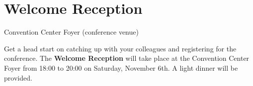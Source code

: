 \clearpage
\section[Welcome Reception]{Welcome Reception}
\setheaders{}{\daydateyear}

\begin{center}


Convention Center Foyer (conference venue)\\
\end{center}

\noindent Get a head start on catching up with your colleagues and registering for the conference.
The \textbf{Welcome Reception} will take place at the Convention Center Foyer from 18:00 to 20:00 on Saturday, November 6th.
A light dinner will be provided.
